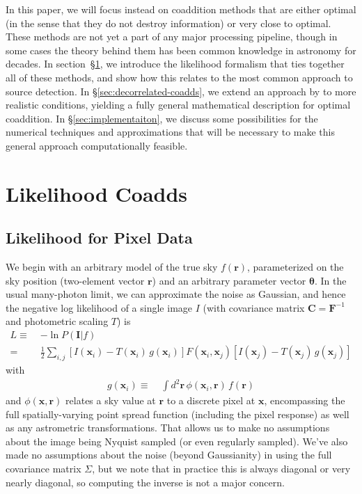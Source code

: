 \documentclass[10pt]{article}
\newcommand{\secref}[1]{\S\ref{sec:#1}}
\begin{document}
In this paper, we will focus instead on coaddition methods that are either optimal (in the sense that they do not destroy information) or very close to optimal.  These methods are not yet a part of any major processing pipeline, though in some cases the theory behind them has been common knowledge in astronomy for decades.  In section~\secref{likelihood-coadds}, we introduce the likelihood formalism that ties together all of these methods, and show how this relates to the most common approach to source detection.  In \secref{decorrelated-coadds}, we extend an approach by \cite{Kaiser2001} to more realistic conditions, yielding a fully general mathematical description for optimal coaddition.  In \secref{implementaiton}, we discuss some possibilities for the numerical techniques and approximations that will be necessary to make this general approach computationally feasible.

\section{Likelihood Coadds}
\label{sec:likelihood-coadds}

\subsection{Likelihood for Pixel Data}
\label{sec:pixel-likelihood}

We begin with an arbitrary model of the true sky $f(\bm{r})$, parameterized on the sky position (two-element vector $\bm{r}$) and an arbitrary parameter vector $\bm{\theta}$.  In the usual many-photon limit, we can approximate the noise as Gaussian, and hence the negative log likelihood of a single image $I$ (with covariance matrix $\bm{C}=\bm{F}^{-1}$ and photometric scaling $T$) is
\begin{align}
    L \equiv\;& -\ln P(\bm{I}|f) \\
    =\;& \frac{1}{2} \sum_{i,j}
        \left[I(\bm{x}_i) - T(\bm{x}_i)\,g(\bm{x}_i)\right]
        F(\bm{x}_i,\bm{x}_j)
        \left[I(\bm{x}_j) - T(\bm{x}_j)\,g(\bm{x}_j)\right]
    \label{eqn:original-likelihood}
\end{align}
with
\begin{align}
g(\bm{x}_i) \equiv\;&
    \int\! d^2 \bm{r} \, \phi(\bm{x}_i,\bm{r}) \, f(\bm{r})
    \label{eqn:convolved-model-def}
\end{align}
and $\phi(\bm{x},\bm{r})$ relates a sky value at $\bm{r}$ to a discrete pixel at $\bm{x}$, encompassing the full spatially-varying point spread function (including the pixel response) as well as any astrometric transformations.  That allows us to make no assumptions about the image being Nyquist sampled (or even regularly sampled).  We've also made no assumptions about the noise (beyond Gaussianity) in using the full covariance matrix $\Sigma$, but we note that in practice this is always diagonal or very nearly diagonal, so computing the inverse is not a major concern.
\end{document}
